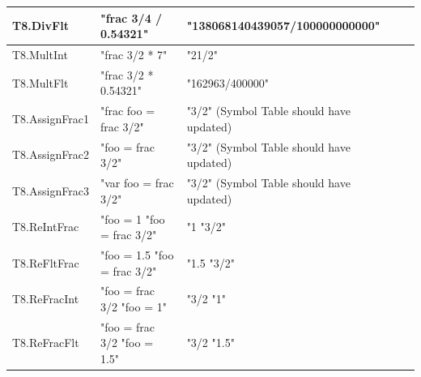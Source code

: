\documentclass[a4paper, oneside, 11pt]{report}
\begin{document}
\begin{table}
\begin{tabular}{|p{1.5in}|p{1.5in}|p{1.6in}|p{1.6in}|p{2.4in}|}
\hline
T8.DivFlt      & "frac 3/4 / 0.54321"                           & "138068140439057/100000000000"           &                                        \\ 
\hline
T8.MultInt     & "frac 3/2 * 7"                                 & "21/2"                                   &                                        \\ 
\hline
T8.MultFlt     & "frac 3/2 * 0.54321"                           & "162963/400000"                          &                                        \\ 
\hline
T8.AssignFrac1 & "frac foo = frac 3/2"                          & "3/2" (Symbol Table should have updated) &                                        \\ 
\hline
T8.AssignFrac2 & "foo = frac 3/2"                               & "3/2" (Symbol Table should have updated) &                                        \\ 
\hline
T8.AssignFrac3 & "var foo = frac 3/2"                           & "3/2" (Symbol Table should have updated) &                                        \\ 
\hline
T8.ReIntFrac   & "foo = 1 "foo = frac 3/2"                      & "1 "3/2"                                 &                                        \\ 
\hline
T8.ReFltFrac   & "foo = 1.5 "foo = frac 3/2"                    & "1.5 "3/2"                               &                                        \\ 
\hline
T8.ReFracInt   & "foo = frac 3/2 "foo = 1"                      & "3/2 "1"                                 &                                        \\ 
\hline
T8.ReFracFlt   & "foo = frac 3/2 "foo = 1.5"                    & "3/2 "1.5"                               &                                        \\
\hline
\end{tabular}
\end{table}
\end{document}
